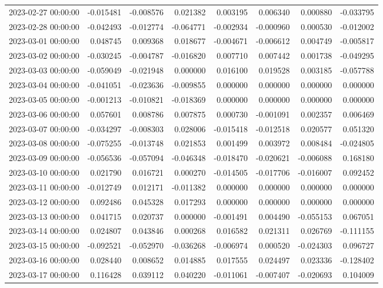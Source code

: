 \begin{tabular}{lrrrrrrr}
2023-02-27 00:00:00 & -0.015481 & -0.008576 & 0.021382 & 0.003195 & 0.006340 & 0.000880 & -0.033795 \\
2023-02-28 00:00:00 & -0.042493 & -0.012774 & -0.064771 & -0.002934 & -0.000960 & 0.000530 & -0.012002 \\
2023-03-01 00:00:00 & 0.048745 & 0.009368 & 0.018677 & -0.004671 & -0.006612 & 0.004749 & -0.005817 \\
2023-03-02 00:00:00 & -0.030245 & -0.004787 & -0.016820 & 0.007710 & 0.007442 & 0.001738 & -0.049295 \\
2023-03-03 00:00:00 & -0.059049 & -0.021948 & 0.000000 & 0.016100 & 0.019528 & 0.003185 & -0.057788 \\
2023-03-04 00:00:00 & -0.041051 & -0.023636 & -0.009855 & 0.000000 & 0.000000 & 0.000000 & 0.000000 \\
2023-03-05 00:00:00 & -0.001213 & -0.010821 & -0.018369 & 0.000000 & 0.000000 & 0.000000 & 0.000000 \\
2023-03-06 00:00:00 & 0.057601 & 0.008786 & 0.007875 & 0.000730 & -0.001091 & 0.002357 & 0.006469 \\
2023-03-07 00:00:00 & -0.034297 & -0.008303 & 0.028006 & -0.015418 & -0.012518 & 0.020577 & 0.051320 \\
2023-03-08 00:00:00 & -0.075255 & -0.013748 & 0.021853 & 0.001499 & 0.003972 & 0.008484 & -0.024805 \\
2023-03-09 00:00:00 & -0.056536 & -0.057094 & -0.046348 & -0.018470 & -0.020621 & -0.006088 & 0.168180 \\
2023-03-10 00:00:00 & 0.021790 & 0.016721 & 0.000270 & -0.014505 & -0.017706 & -0.016007 & 0.092452 \\
2023-03-11 00:00:00 & -0.012749 & 0.012171 & -0.011382 & 0.000000 & 0.000000 & 0.000000 & 0.000000 \\
2023-03-12 00:00:00 & 0.092486 & 0.045328 & 0.017293 & 0.000000 & 0.000000 & 0.000000 & 0.000000 \\
2023-03-13 00:00:00 & 0.041715 & 0.020737 & 0.000000 & -0.001491 & 0.004490 & -0.055153 & 0.067051 \\
2023-03-14 00:00:00 & 0.024807 & 0.043846 & 0.000268 & 0.016582 & 0.021311 & 0.026769 & -0.111155 \\
2023-03-15 00:00:00 & -0.092521 & -0.052970 & -0.036268 & -0.006974 & 0.000520 & -0.024303 & 0.096727 \\
2023-03-16 00:00:00 & 0.028440 & 0.008652 & 0.014885 & 0.017555 & 0.024497 & 0.023336 & -0.128402 \\
2023-03-17 00:00:00 & 0.116428 & 0.039112 & 0.040220 & -0.011061 & -0.007407 & -0.020693 & 0.104009 \\

\end{tabular}
